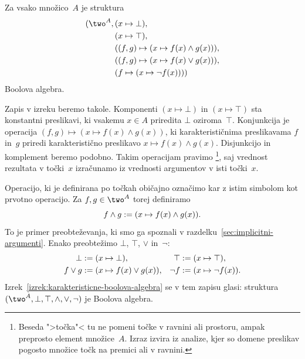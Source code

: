 \begin{izrek}
  \label{izrek:karakteristicne-boolova-algebra}
  Za vsako množico~$A$ je struktura
  \begin{equation*}
    \begin{aligned}
      (\two^A, {}
      &(x \mapsto \bot), \\
      &(x \mapsto \top), \\
      &((f, g) \mapsto (x \mapsto f(x) \land g(x))), \\
      &((f, g) \mapsto (x \mapsto f(x) \lor g(x))), \\
      &(f \mapsto (x \mapsto \neg f(x))))
    \end{aligned}
  \end{equation*}
  Boolova algebra.
\end{izrek}

Zapis v izreku beremo takole.
%
Komponenti $(x \mapsto \bot)$ in $(x \mapsto \top)$ sta konstantni preslikavi, ki vsakemu $x \in A$ priredita $\bot$ oziroma~$\top$.
%
Konjunkcija je operacija $(f, g) \mapsto (x \mapsto f(x) \land g(x))$, ki karakterističnima preslikavama $f$ in~$g$ priredi karakteristično preslikavo $x \mapsto f(x) \land g(x)$.
%
Disjunkcijo in komplement beremo podobno.
%
Takim operacijam pravimo \footnote{Beseda ">točka"< tu ne pomeni točke v ravnini ali prostoru, ampak preprosto element množice~$A$. Izraz izvira iz analize, kjer so domene preslikav pogosto množice točk na premici ali v ravnini.}, saj vrednost rezultata v točki~$x$ izračunamo iz vrednosti argumentov v isti točki~$x$.

Operacijo, ki je definirana po točkah običajno označimo kar z istim simbolom kot prvotno operacijo.
%
Za $f, g \in \two^A$ torej definiramo
%
\begin{equation*}
  f \land g \mathrel{{:}{=}} (x \mapsto f(x) \land g(x)).
\end{equation*}
%
To je primer preobteževanja, ki smo ga spoznali v razdelku~\ref{sec:implicitni-argumenti}.
%
Enako preobtežimo $\bot$, $\top$, $\lor$ in~$\neg$:
%
\begin{align*}
  \bot &\mathrel{{:}{=}} (x \mapsto \bot), &
  \top &\mathrel{{:}{=}} (x \mapsto \top), \\
  f \lor g &\mathrel{{:}{=}} (x \mapsto f(x) \lor g(x)), &
  \neg f &\mathrel{{:}{=}} (x \mapsto \neg f(x)).
\end{align*}
%
Izrek~\ref{izrek:karakteristicne-boolova-algebra} se v tem zapisu glasi: struktura $(\two^A, \bot, \top, {\land}, {\lor}, {\neg})$ je Boolova algebra.

